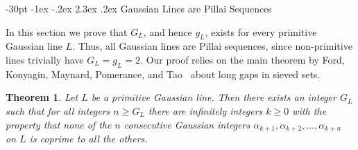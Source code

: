 \documentclass[11pt]{article}
\makeatletter
\renewcommand\section{\@startsection {section}{1}{\z@}
{-30pt \@plus -1ex \@minus -.2ex}
{2.3ex \@plus.2ex}
{\normalfont\normalsize\bfseries\boldmath}}
\newtheorem{theorem}{Theorem}
\makeatother
\begin{document}
\section{Gaussian Lines are Pillai Sequences}

In this section we prove that $G_L$, and hence $g_L$, exists for every primitive Gaussian line $L$. Thus, all Gaussian lines are Pillai sequences, since non-primitive lines trivially have $G_L=g_L=2$. Our proof relies on  the main theorem by Ford, Konyagin, Maynard, Pomerance, and Tao~\cite{ford} about long gaps in sieved sets.

\begin{theorem}\label{GL} Let $L$ be a primitive Gaussian line.  Then there exists an integer $G_L$ such that for all integers $n\geq G_L$ there are infinitely integers $k\geq 0$ with the property that none of the $n$ consecutive Gaussian integers $\alpha_{k+1}, \alpha_{k+2},\ldots, \alpha_{k+n}$ on $L$ is coprime to all the others.

\end{theorem}
\end{document}
